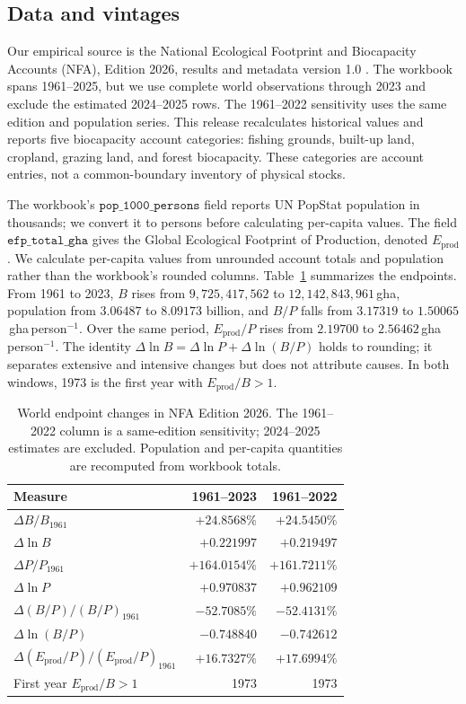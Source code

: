 \documentclass[11pt,a4paper]{article}
\begin{document}
\subsection{Data and vintages}\label{si:vintages}

Our empirical source is the National Ecological Footprint and Biocapacity Accounts (NFA), Edition 2026, results and metadata version 1.0 \citep{Lo2026NFA}. The workbook spans 1961--2025, but we use complete world observations through 2023 and exclude the estimated 2024--2025 rows. The 1961--2022 sensitivity uses the same edition and population series. This release recalculates historical values and reports five biocapacity account categories: fishing grounds, built-up land, cropland, grazing land, and forest biocapacity. These categories are account entries, not a common-boundary inventory of physical stocks.

The workbook's $\texttt{pop\_1000\_persons}$ field reports UN PopStat population in thousands; we convert it to persons before calculating per-capita values. The field $\texttt{efp\_total\_gha}$ gives the Global Ecological Footprint of Production, denoted $E_{\mathrm{prod}}$. We calculate per-capita values from unrounded account totals and population rather than the workbook's rounded columns. Table~\ref{tab:si_nfa_endpoints} summarizes the endpoints. From 1961 to 2023, $B$ rises from $9{,}725{,}417{,}562$ to $12{,}142{,}843{,}961$\,gha, population from $3.06487$ to $8.09173$ billion, and $B/P$ falls from $3.17319$ to $1.50065$\,gha\,person$^{-1}$. Over the same period, $E_{\mathrm{prod}}/P$ rises from $2.19700$ to $2.56462$\,gha\,person$^{-1}$. The identity $\Delta\ln B=\Delta\ln P+\Delta\ln(B/P)$ holds to rounding; it separates extensive and intensive changes but does not attribute causes. In both windows, 1973 is the first year with $E_{\mathrm{prod}}/B>1$.

\begin{table}[htbp]
\centering\small
\caption{World endpoint changes in NFA Edition 2026. The 1961--2022 column is a same-edition sensitivity; 2024--2025 estimates are excluded. Population and per-capita quantities are recomputed from workbook totals.}
\label{tab:si_nfa_endpoints}
\begin{tabularx}{\textwidth}{>{\raggedright\arraybackslash}Xrr}
\toprule
Measure & 1961--2023 & 1961--2022 \\
\midrule
$\Delta B/B_{1961}$ & $+24.8568\%$ & $+24.5450\%$ \\
$\Delta\ln B$ & $+0.221997$ & $+0.219497$ \\
$\Delta P/P_{1961}$ & $+164.0154\%$ & $+161.7211\%$ \\
$\Delta\ln P$ & $+0.970837$ & $+0.962109$ \\
$\Delta(B/P)/(B/P)_{1961}$ & $-52.7085\%$ & $-52.4131\%$ \\
$\Delta\ln(B/P)$ & $-0.748840$ & $-0.742612$ \\
$\Delta(E_{\mathrm{prod}}/P)/(E_{\mathrm{prod}}/P)_{1961}$ & $+16.7327\%$ & $+17.6994\%$ \\
First year $E_{\mathrm{prod}}/B>1$ & 1973 & 1973 \\
\bottomrule
\end{tabularx}
\end{table}
\end{document}
